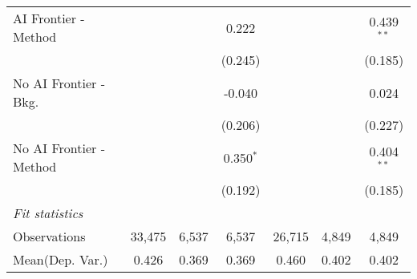 \begin{tabular}{lcccccc}
   AI Frontier - Method    &               &              & 0.222        &               &              & 0.439$^{**}$\\   
                           &               &              & (0.245)      &               &              & (0.185)\\   
   No AI Frontier - Bkg.   &               &              & -0.040       &               &              & 0.024\\   
                           &               &              & (0.206)      &               &              & (0.227)\\   
   No AI Frontier - Method &               &              & 0.350$^{*}$  &               &              & 0.404$^{**}$\\   
                           &               &              & (0.192)      &               &              & (0.185)\\   
   \midrule
   \emph{Fit statistics}\\
   Observations            & 33,475        & 6,537        & 6,537        & 26,715        & 4,849        & 4,849\\  
Mean(Dep. Var.) & 0.426 & 0.369 & 0.369 & 0.460 & 0.402 & 0.402 \\
   

\end{tabular}
